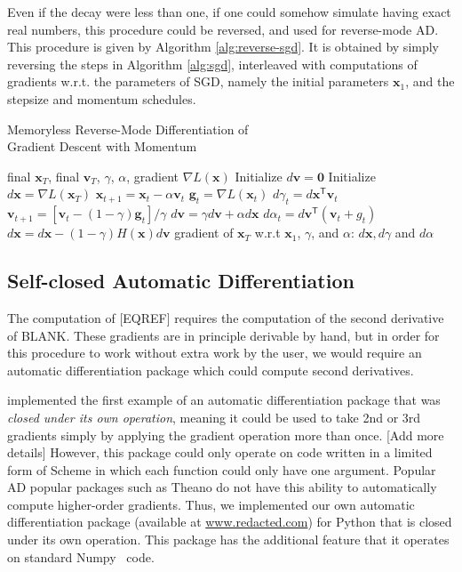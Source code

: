 \documentclass{article}
\newcommand{\vx}{\mathbf{x}}
\newcommand{\vv}{\mathbf{v}}
\newcommand{\vg}{\mathbf{g}}
\newcommand{\vzero}{\mathbf{0}}
\newcommand{\tra}{^{\mathsf{T}}}
\newcommand{\decay}{\gamma}
\newcommand{\stepsize}{\alpha}
\begin{document}
Even if the decay were less than one, if one could somehow simulate having exact real numbers, this procedure could be reversed, and used for reverse-mode AD.
This procedure is given by Algorithm \ref{alg:reverse-sgd}.
It is obtained by simply reversing the steps in Algorithm \ref{alg:sgd}, interleaved with computations of gradients w.r.t. the parameters of SGD, namely the initial parameters $\vx_1$, and the stepsize and momentum schedules.
%
\begin{algorithm}
   \caption{Memoryless Reverse-Mode Differentiation of \\Gradient Descent with Momentum}
   \label{alg:reverse-sgd}
\begin{algorithmic}
    final $\vx_T$, final $\vv_T$, $\decay$, $\stepsize$, gradient $\nabla L(\vx)$
   \STATE Initialize $d\vv = \vzero$
   \STATE Initialize $d\vx = \nabla L(\vx_T)$
    \STATE $\vx_{t+1} = \vx_t - \stepsize \vv_t$  
   \STATE $\vg_t = \nabla L(\vx_t)$
   \STATE $d\decay_t = d\vx\tra \vv_t$
   \STATE $\vv_{t+1} = [\vv_t - (1 - \decay) \vg_t] / \decay$ 
   \STATE $d\vv = \decay d\vv + \stepsize d\vx$
   \STATE $d\stepsize_t = d\vv\tra(\vv_t + g_t)$
   \STATE $d\vx = d\vx - (1 - \decay) H(\vx) d\vv$
   \ENDFOR
   \RETURN gradient of $\vx_T$ w.r.t $\vx_1$, $\decay$, and $\stepsize$: $d\vx, d\decay$ and $d\stepsize$
\end{algorithmic}
\end{algorithm}
%

\subsection{Self-closed Automatic Differentiation}

The computation of [EQREF] requires the computation of the second derivative of BLANK.
These gradients are in principle derivable by hand, but in order for this procedure to work without extra work by the user, we would require an automatic differentiation package which could compute second derivatives.

\citet{pearlmutter2008reverse} implemented the first example of an automatic differentiation package that was \emph{closed under its own operation}, meaning it could be used to take 2nd or 3rd gradients simply by applying the gradient operation more than once. [Add more details]
However, this package could only operate on code written in a limited form of Scheme in which each function could only have one argument.
Popular AD popular packages such as Theano do not have this ability to automatically compute higher-order gradients.
Thus, we implemented our own automatic differentiation package (available at \url{www.redacted.com}) for Python that is closed under its own operation.
This package has the additional feature that it operates on standard Numpy~\cite{oliphant2007python} code.
\end{document}
